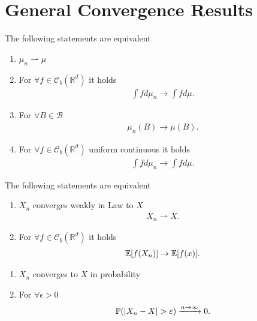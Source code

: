 \section{General Convergence Results}
\begin{definition}
 The following statements are equivalent   
 \begin{enumerate}
   \item $\mu_n \rightharpoonup \mu $
   \item For $\forall  f \in  \mathcal{C}_b(\mathbb{R}^{d} )$ it holds 
 \begin{align*}
  \int f d\mu_n \to \int  f d\mu 
 .\end{align*}
\item For $\forall  B \in \mathcal{B} $  
  \begin{align*}
    \mu_n(B) \to  \mu(B)
  .\end{align*}
\item For $\forall f \in  \mathcal{C}_b(\mathbb{R}^{d} )$ uniform continuous it holds 
  \begin{align*}
    \int  f d\mu_n \to  \int f d\mu 
  .\end{align*}
 \end{enumerate}
\end{definition}
\begin{definition}
 The following statements are equivalent  
 \begin{enumerate}
   \item $X_n$ converges weakly in Law to $X$  
     \begin{align*}
      X_n \rightharpoonup X
     .\end{align*}
   \item For $\forall f \in  \mathcal{C}_b(\mathbb{R}^{d} )$ it holds 
     \begin{align*}
       \mathbb{E}[f(X_n)] \to \mathbb{E}[f(x)]
     .\end{align*}
 \end{enumerate}
 \begin{enumerate}
   \item $X_n$ converges to $X$ in probability
   \item For $\forall \epsilon  >0$ 
     \begin{align*}
       \mathbb{P}(\lvert X_n - X\rvert >\varepsilon ) \xrightarrow{n\to \infty} 0
     .\end{align*}
 \end{enumerate}
\end{definition}
